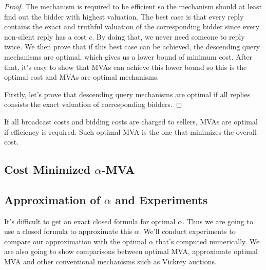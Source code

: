 \begin{proof}

The mechanism is required to be efficient so the mechanism should at least find
out the bidder with highest valuation. The best case is that every reply
contains the exact and truthful valuation of the corresponding bidder since
every non-silent reply has a cost $c$. By doing that, we never need someone to
reply twice. We then prove that if this best case can be achieved, the
descending query mechanisms are optimal, which gives us a lower bound of
minimum cost. After that, it's easy to show that MVAs can achieve this lower
bound so this is the optimal cost and MVAs are optimal mechanisms.

Firstly, let's prove that descending query mechanisms are optimal if all replies
consists the exact valuation of corresponding bidders.

\end{proof}


\begin{corollary}

If all broadcast costs and bidding costs are charged to sellers, MVAs are
optimal if efficiency is required.  Such optimal MVA is the one that minimizes
the overall cost.

\end{corollary}

\subsection{Cost Minimized $\alpha$-MVA}

\subsection{Approximation of $\alpha$ and Experiments}

It's difficult to get an exact closed formula for optimal $\alpha$. Thus we are
going to use a closed formula to approximate this $\alpha$. We'll conduct
experiments to compare our approximation with the optimal $\alpha$ that's
computed numerically. We are also going to show comparisons between optimal
MVA, approximate optimal MVA and other conventional mechanisms such as Vickrey
auctions.


